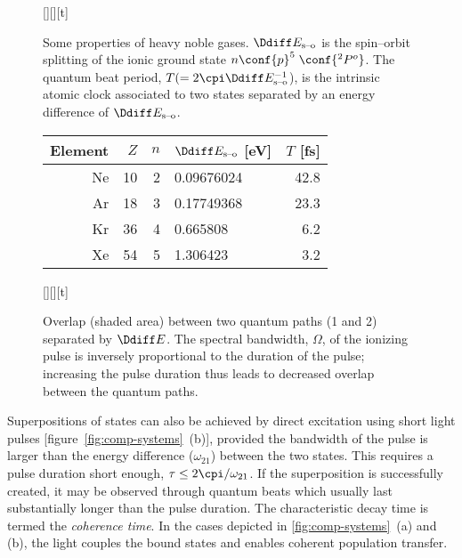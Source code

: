 \begin{figure}[tb]
  \begin{floatrow}
    [][][t]{\caption{\label{tab:quantum-beat-periods}
        Some properties of heavy noble gases.
        \(\Ddiff E_{\textrm{s--o}}\) is the spin--orbit splitting of the
        ionic ground state \(n\conf{p}^5\;\conf{^2P^o}\). The quantum
        beat period, \(T (=2\cpi\Ddiff E_{\textrm{s--o}}^{-1}\)), is
        the intrinsic atomic clock associated to two states separated
        by an energy difference of \(\Ddiff E_{\textrm{s--o}}\).}}{
      \footnotesize
      \begin{tabular}{rrrlr}
        Element & \(Z\) & \(n\)
        & \(\Ddiff E_{\textrm{s--o}}\) [\si{\electronvolt}]
        & \(T\) [\si{\femto\second}]\\
        \hline
        Ne & 10 & 2 & 0.09676024 & 42.8\\
        Ar & 18 & 3 & 0.17749368  & 23.3\\
        Kr & 36 & 4 & 0.665808  & 6.2\\
        Xe & 54 & 5 & 1.306423 & 3.2\\
      \end{tabular}
    }
    [][][t]{\caption{\label{fig:quantum-path-overlap}
        Overlap (shaded area) between two quantum paths (1 and 2)
        separated by \(\Ddiff E\). The spectral bandwidth, \(\Omega\), of
        the ionizing pulse is inversely proportional to the duration
        of the pulse; increasing the pulse duration thus leads to
        decreased overlap between the quantum
        paths. %
        }} {}
  \end{floatrow}
\end{figure}
Superpositions of states can also be achieved by direct excitation
using short light pulses [figure~\ref{fig:comp-systems}~(b)], provided
the bandwidth of the pulse is larger than the energy difference
(\(\omega_{21}\)) between the two states.  This requires a pulse duration
short enough, \(\tau \leq {2\cpi}/{\omega_{21}}\). If the superposition is
successfully created, it may be observed through quantum beats
\parencite{Teets1977,Salour1977,Mauritsson2010PRL,Tzallas2011NP} which
usually last substantially longer than the pulse duration. The
characteristic decay time is termed the \emph{coherence time}. In the
cases depicted in \ref{fig:comp-systems}~(a) and (b), the light
couples the bound states and enables coherent population transfer.


